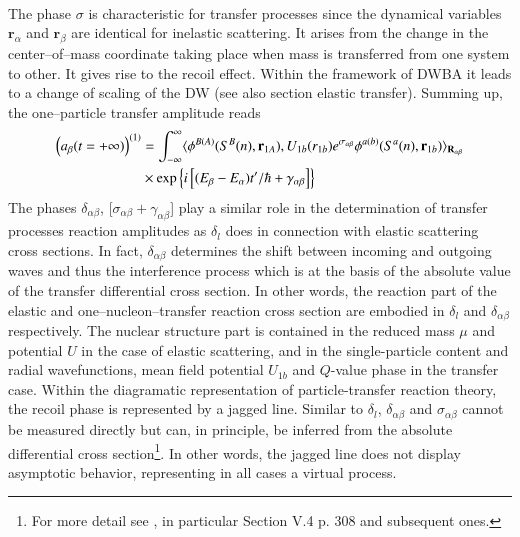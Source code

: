 \begin{subappendices}
\begin{align}
\end{align} 
 The phase $\sigma$ is characteristic for transfer processes since the dynamical variables $\mathbf r_\alpha$ and $\mathbf r_\beta$ are identical for inelastic scattering. It arises from the change in the center--of--mass coordinate taking place when mass is transferred from one system to other. It gives rise to the recoil effect. Within the framework of DWBA it leads to a change of scaling of the DW (see also section elastic transfer). Summing up, the one--particle transfer amplitude reads
 \begin{align}\label{eq1.D.37}
\nonumber \left(a_\beta(t=+\infty)\right)^{(1)}&=\int_{-\infty}^{\infty}\langle {\phi^{B(A)}(S^B(n),\mathbf r_{1A}),U_{1b}(r_{1b})e^{\sigma_{\alpha\beta}}\phi^{a(b)}(S^a(n),\mathbf r_{1b})} \rangle_{\mathbf R_{\alpha\beta}}\\
&\times\exp\left\{i\left[(E_\beta-E_\alpha)t'/\hbar+\gamma_{\alpha\beta}\right]\right\}
 \end{align}
 The phases $\delta_{\alpha\beta}$, [$\sigma_{\alpha\beta}+\gamma_{\alpha\beta}$] play a similar role in the determination of transfer processes reaction amplitudes as $\delta_l$ does in connection with elastic scattering cross sections. In fact, $\delta_{\alpha\beta}$ determines the shift between incoming and outgoing waves and thus the interference process which is at the basis of the absolute value of the transfer differential cross section. In other words, the reaction part of the elastic and one--nucleon--transfer reaction cross section are embodied in $\delta_l$ and $\delta_{\alpha\beta}$ respectively. The nuclear structure part is contained in the reduced mass $\mu$ and potential $U$ in the case of elastic scattering, and in the single-particle content and radial wavefunctions, mean field potential $U_{1b}$ and $Q$-value phase in the transfer case. Within the diagramatic representation of particle-transfer reaction theory, the recoil phase is represented by a jagged line. Similar to $\delta_l$, $\delta_{\alpha\beta}$  and $\sigma_{\alpha\beta}$ cannot be measured directly but can, in principle,  be inferred from the absolute differential cross section\footnote{For more detail see \cite{Broglia:04a}, in particular Section V.4 p. 308 and subsequent ones.}. In other words, the jagged line does not display asymptotic behavior, representing in all cases a virtual process.  
 
 
 

\end{subappendices}
